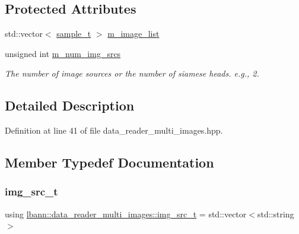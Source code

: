 \subsection*{Protected Attributes}
\begin{DoxyCompactItemize}
\item 
std\+::vector$<$ \hyperlink{classlbann_1_1data__reader__multi__images_a6cbb30001dd633b0d810c417cbbf441e}{sample\+\_\+t} $>$ \hyperlink{classlbann_1_1data__reader__multi__images_a6d8e2d161c9efff1ac70f847b4a7e9d0}{m\+\_\+image\+\_\+list}
\item 
unsigned int \hyperlink{classlbann_1_1data__reader__multi__images_a70752a5442e99333fec52def9eadc58f}{m\+\_\+num\+\_\+img\+\_\+srcs}
\begin{DoxyCompactList}\small\item\em The number of image sources or the number of siamese heads. e.\+g., 2. \end{DoxyCompactList}\end{DoxyCompactItemize}


\subsection{Detailed Description}


Definition at line 41 of file data\+\_\+reader\+\_\+multi\+\_\+images.\+hpp.



\subsection{Member Typedef Documentation}
\mbox{\label{classlbann_1_1data__reader__multi__images_ac817914ad82e09471f13fce5b0b5faef}} 
\subsubsection{\texorpdfstring{img\+\_\+src\+\_\+t}{img\_src\_t}}
{\footnotesize\ttfamily using \hyperlink{classlbann_1_1data__reader__multi__images_ac817914ad82e09471f13fce5b0b5faef}{lbann\+::data\+\_\+reader\+\_\+multi\+\_\+images\+::img\+\_\+src\+\_\+t} =  std\+::vector$<$std\+::string$>$}



